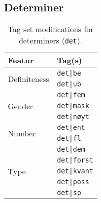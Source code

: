 \documentclass[a4paper,12pt,english]{book}
\begin{document}
\begin{appendices}
    \section{Determiner}
    \begin{table}
        \centering
        \smaller[1]
        \begin{tabular}{@{}ll@{}}
            \toprule
            \textbf{Featur} & \textbf{Tag(s)} \\
            \midrule
            \multirow{2}{*}{Definiteness}
            & \texttt{det|be} \\
            & \texttt{det|ub} \\
            \midrule
            \multirow{3}{*}{Gender}
            & \texttt{det|fem} \\
            & \texttt{det|mask} \\
            & \texttt{det|nøyt} \\
            \midrule
            \multirow{2}{*}{Number}
            & \texttt{det|ent} \\
            & \texttt{det|fl} \\
            \midrule
            \multirow{5}{*}{Type}
            & \texttt{det|dem} \\
            & \texttt{det|forst} \\
            & \texttt{det|kvant} \\
            & \texttt{det|poss} \\
            & \texttt{det|sp} \\
            \bottomrule
        \end{tabular}
        \caption{Tag set modifications for determiners (\texttt{det}).}
        \label{dettagsets}
    \end{table}


\end{appendices}
\end{document}

